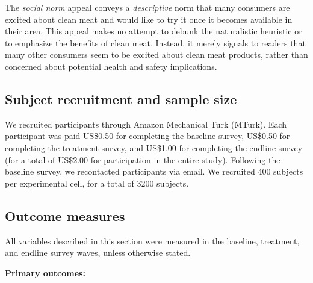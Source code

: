 \documentclass[12pt]{article}
\begin{document}
The \textit{social norm} appeal conveys a \textit{descriptive} norm that many consumers are excited about clean meat and would like to try it once it becomes available in their area. This appeal makes no attempt to debunk the naturalistic heuristic or to emphasize the benefits of clean meat. Instead, it merely signals to readers that many other consumers seem to be excited about clean meat products, rather than concerned about potential health and safety implications.

\subsection{Subject recruitment and sample size}

We recruited participants through Amazon Mechanical Turk (MTurk). Each participant was paid US\$0.50 for completing the baseline survey, US\$0.50 for completing the treatment survey, and US\$1.00 for completing the endline survey (for a total of US\$2.00 for participation in the entire study). Following the baseline survey, we recontacted participants via email. We recruited 400 subjects per experimental cell, for a total of 3200 subjects.



\subsection{Outcome measures}

All variables described in this section were measured in the baseline, treatment, and endline survey waves, unless otherwise stated. 


\textbf{Primary outcomes:}
\end{document}
